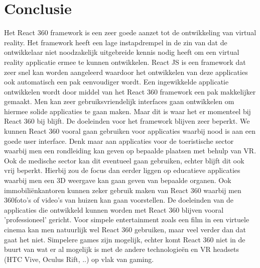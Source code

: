 
\chapter{Conclusie}
\label{ch:conclusie}


Het React 360 framework is een zeer goede aanzet tot de ontwikkeling van virtual reality. Het framework heeft een lage instapdrempel in de zin van dat de ontwikkelaar niet noodzakelijk uitgebreide kennis nodig heeft om een virtual reality applicatie ermee te kunnen ontwikkelen. React JS is een framework dat zeer snel kan worden aangeleerd waardoor het ontwikkelen van deze applicaties ook automatisch een pak eenvoudiger wordt. Een ingewikkelde applicatie ontwikkelen wordt door middel van het React 360 framework een pak makkelijker gemaakt. Men kan zeer gebruiksvriendelijk interfaces gaan ontwikkelen om hiermee solide applicaties te gaan maken. Maar dit is waar het er momenteel bij React 360 bij blijft. De doeleinden voor het framework blijven zeer beperkt. We kunnen React 360 vooral gaan gebruiken voor applicaties waarbij nood is aan een goede user interface. Denk maar aan applicaties voor de toeristische sector waarbij men een rondleiding kan geven op bepaalde plaatsen met behulp van VR. Ook de medische sector kan dit eventueel gaan gebruiken, echter blijft dit ook vrij beperkt. Hierbij zou de focus dan eerder liggen op educatieve applicaties waarbij men een 3D weergave kan gaan geven van bepaalde organen. Ook immobiliënkantoren  kunnen zeker gebruik maken van React 360 waarbij men 360\textdegree foto's of video's van huizen kan gaan voorstellen. De doeleinden van de applicaties die ontwikkeld kunnen worden met React 360 blijven vooral 'professioneel' gericht. Voor simpele entertainment zoals een film in een virtuele cinema kan men natuurlijk wel React 360 gebruiken, maar veel verder dan dat gaat het niet. Simpelere games zijn mogelijk, echter komt React 360 niet in de buurt van wat er al mogelijk is met de andere technologieën en VR headsets (HTC Vive, Oculus Rift, ..) op vlak van gaming. 

